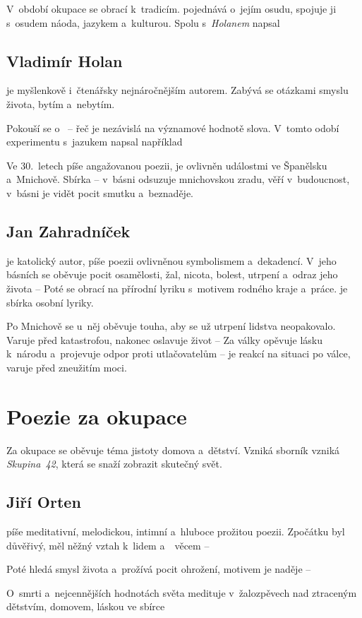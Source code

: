 V~období okupace se obrací k~tradicím. 
pojednává o~jejím osudu, spojuje ji s~osudem náoda, jazykem a~kulturou.
Spolu s~\emph{Holanem} napsal 

\subsection*{Vladimír Holan}
 je myšlenkově i~čtenářsky nejnáročnějším autorem.
Zabývá se otázkami smyslu života, bytím a~nebytím.

Pokouší se o~ -- řeč je nezávislá na významové hodnotě slova.
V~tomto odobí experimentu s~jazukem napsal například 

Ve 30.~letech píše angažovanou poezii, je ovlivněn událostmi ve
Španělsku a~Mnichově. Sbírka  -- v~básni
 odsuzuje mnichovskou zradu, věří v~budoucnost,
v~básni  je vidět pocit smutku a~beznaděje.

\subsection*{Jan Zahradníček}
 je katolický autor, píše poezii ovlivněnou
symbolismem a~dekadencí. V~jeho básních se oběvuje pocit osamělosti,
žal, nicota, bolest, utrpení a~odraz jeho života --  Poté se obrací na přírodní lyriku s~motivem rodného kraje
a~práce.  je sbírka osobní lyriky.

Po Mnichově se u~něj oběvuje touha, aby se už utrpení lidstva
neopakovalo. Varuje před katastrofou, nakonec oslavuje život --
 Za války opěvuje lásku k~národu a~projevuje odpor proti
utlačovatelům --     je reakcí na situaci po válce, varuje před
zneužitím moci.

\section{Poezie za okupace}
Za okupace se oběvuje téma jistoty domova a~dětství. Vzniká sborník
 vzniká \emph{Skupina~42}, která se snaží
zobrazit skutečný svět.

\subsection*{Jiří Orten}
 píše meditativní, melodickou, intimní a~hluboce
prožitou poezii. Zpočátku byl důvěřivý, měl něžný vztah k~lidem
a~~věcem -- 

Poté hledá smysl života a~prožívá pocit ohrožení, motivem je naděje --
  

O~smrti a~nejcennějších hodnotách světa medituje v~žalozpěvech nad
ztraceným dětstvím, domovem, láskou ve sbírce 